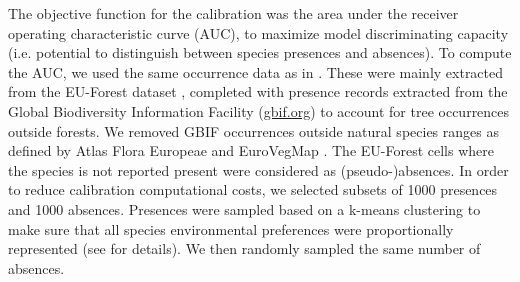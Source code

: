 \documentclass[preprint,12pt,authoryear]{elsarticle}
\begin{document}
The objective function for the calibration was the area under the receiver operating characteristic curve (AUC), to maximize model discriminating capacity (i.e. potential to distinguish between species presences and absences). To compute the AUC, we used the same occurrence data as in \citet{VanderMeersch2023}. These were mainly extracted from the EU-Forest dataset \citep{Mauri2017}, completed with presence records extracted from the Global Biodiversity Information Facility (\url{gbif.org}) to account for tree occurrences outside forests. We removed GBIF occurrences outside natural species ranges as defined by Atlas Flora Europeae \citep{AFE2005} and EuroVegMap \citep{EVM2003}. The EU-Forest cells where the species is not reported present were considered as (pseudo-)absences. In order to reduce calibration computational costs, we selected subsets of 1000 presences and 1000 absences. Presences were sampled based on a k-means clustering to make sure that all species environmental preferences were proportionally represented (see \citet{VanderMeersch2023} for details). \textcolor{customred}{We then randomly sampled the same number of absences.}
\end{document}
